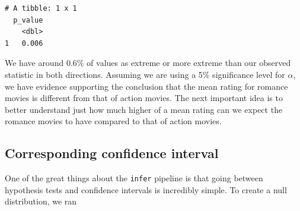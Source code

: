 \documentclass[12pt, krantz2,]{krantz}
\makeatletter
\newenvironment{Shaded}{\begin{snugshade}}{\end{snugshade}}
\newcommand{\DataTypeTok}[1]{\textcolor[rgb]{0.27,0.27,0.27}{#1}}
\newcommand{\DecValTok}[1]{\textcolor[rgb]{0.06,0.06,0.06}{#1}}
\newcommand{\KeywordTok}[1]{\textcolor[rgb]{0.27,0.27,0.27}{\textbf{#1}}}
\newcommand{\NormalTok}[1]{#1}
\newcommand{\OperatorTok}[1]{\textcolor[rgb]{0.43,0.43,0.43}{\textbf{#1}}}
\newcommand{\StringTok}[1]{\textcolor[rgb]{0.5,0.5,0.5}{#1}}
\newenvironment{kframe}{%
\medskip{}
\setlength{\fboxsep}{.8em}
 \def\at@end@of@kframe{}%
 \ifinner\ifhmode%
  \def\at@end@of@kframe{\end{minipage}}%
  \begin{minipage}{\columnwidth}%
 \fi\fi%
 \def\FrameCommand##1{\hskip\@totalleftmargin \hskip-\fboxsep
 \colorbox{shadecolor}{##1}\hskip-\fboxsep
     \hskip-\linewidth \hskip-\@totalleftmargin \hskip\columnwidth}%
 \MakeFramed {\advance\hsize-\width
   \@totalleftmargin\z@ \linewidth\hsize
   \@setminipage}}%
 {\par\unskip\endMakeFramed%
 \at@end@of@kframe}
\renewenvironment{Shaded}{\begin{kframe}}{\end{kframe}}
\makeatother
\begin{document}
\begin{Shaded}
\end{Shaded}

\begin{verbatim}
# A tibble: 1 x 1
  p_value
    <dbl>
1   0.006
\end{verbatim}

We have around 0.6\% of values as extreme or more extreme than our observed statistic in both directions. Assuming we are using a 5\% significance level for \(\alpha\), we have evidence supporting the conclusion that the mean rating for romance movies is different from that of action movies. The next important idea is to better understand just how much higher of a mean rating can we expect the romance movies to have compared to that of action movies.

\hypertarget{corresponding-confidence-interval}{%
\subsection{Corresponding confidence interval}\label{corresponding-confidence-interval}}

One of the great things about the \texttt{infer} pipeline is that going between hypothesis tests and confidence intervals is incredibly simple. To create a null distribution, we ran

\begin{Shaded}
\end{Shaded}
\end{document}
